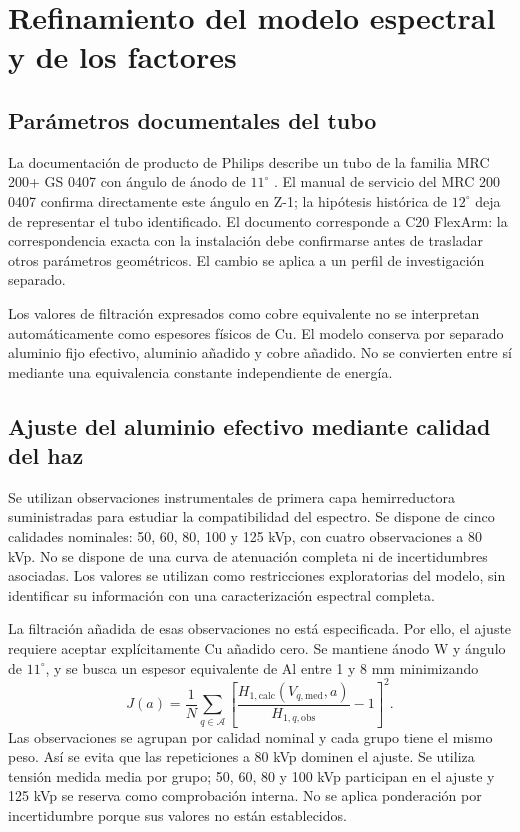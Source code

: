 \chapter{Refinamiento del modelo espectral y de los factores}
\section{Parámetros documentales del tubo}
La documentación de producto de Philips describe un tubo de la familia MRC 200+ GS 0407 con ángulo de ánodo de $11^\circ$ \citep{product0407}. El manual de servicio del MRC 200 0407 confirma directamente este ángulo en Z-1; la hipótesis histórica de $12^\circ$ deja de representar el tubo identificado. El documento corresponde a C20 FlexArm: la correspondencia exacta con la instalación debe confirmarse antes de trasladar otros parámetros geométricos. El cambio se aplica a un perfil de investigación separado.

Los valores de filtración expresados como cobre equivalente no se interpretan automáticamente como espesores físicos de Cu. El modelo conserva por separado aluminio fijo efectivo, aluminio añadido y cobre añadido. No se convierten entre sí mediante una equivalencia constante independiente de energía.

\section{Ajuste del aluminio efectivo mediante calidad del haz}
Se utilizan observaciones instrumentales de primera capa hemirreductora suministradas para estudiar la compatibilidad del espectro. Se dispone de cinco calidades nominales: 50, 60, 80, 100 y 125 kVp, con cuatro observaciones a 80 kVp. No se dispone de una curva de atenuación completa ni de incertidumbres asociadas. Los valores se utilizan como restricciones exploratorias del modelo, sin identificar su información con una caracterización espectral completa.

La filtración añadida de esas observaciones no está especificada. Por ello, el ajuste requiere aceptar explícitamente Cu añadido cero. Se mantiene ánodo W y ángulo de $11^\circ$, y se busca un espesor equivalente de Al entre 1 y 8 mm minimizando
\begin{equation}
J(a)=\frac1N\sum_{q\in\mathcal A}\left[\frac{H_{1,\mathrm{calc}}(V_{q,\mathrm{med}},a)}{H_{1,q,\mathrm{obs}}}-1\right]^2.
\end{equation}
Las observaciones se agrupan por calidad nominal y cada grupo tiene el mismo peso. Así se evita que las repeticiones a 80 kVp dominen el ajuste. Se utiliza tensión medida media por grupo; 50, 60, 80 y 100 kVp participan en el ajuste y 125 kVp se reserva como comprobación interna. No se aplica ponderación por incertidumbre porque sus valores no están establecidos.

